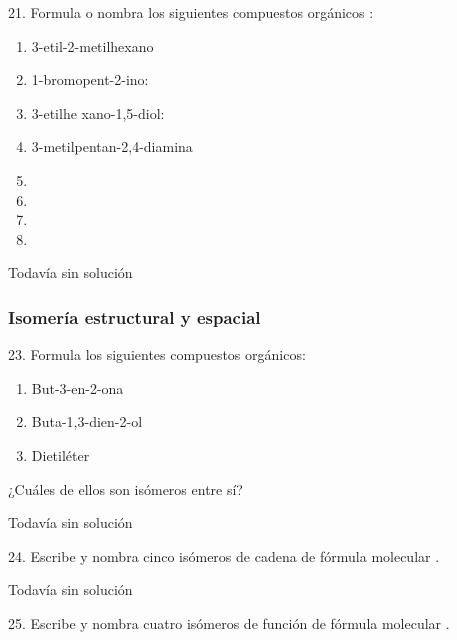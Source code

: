 \documentclass{article}
\begin{document}
\begin{exercise}
  21. Formula o nombra los siguientes compuestos orgánicos :
  \begin{enumerate}
    \item 3-etil-2-metilhexano
    \item 1-bromopent-2-ino:
    \item 3-etilhe xano-1,5-diol:
    \item 3-metilpentan-2,4-diamina
    \item {}
    \item {}
    \item {}
    \item {}
  \end{enumerate}
\end{exercise}

\begin{solution}[print=false]
  Todavía sin solución
\end{solution}

\subsubsection{Isomería estructural y espacial}

\begin{exercise}
  23. Formula los siguientes compuestos orgánicos:
  \begin{enumerate}
    \item But-3-en-2-ona
    \item Buta-1,3-dien-2-ol
    \item Dietiléter
  \end{enumerate}
  ¿Cuáles de ellos son isómeros entre sí?
\end{exercise}

\begin{solution}[print=false]
  Todavía sin solución
\end{solution}

\begin{exercise}
  24. Escribe y nombra cinco isómeros de cadena de fórmula molecular .
\end{exercise}

\begin{solution}[print=false]
  Todavía sin solución
\end{solution}

\begin{exercise}
  25. Escribe y nombra cuatro isómeros de función de fórmula molecular .
\end{exercise}
\end{document}
